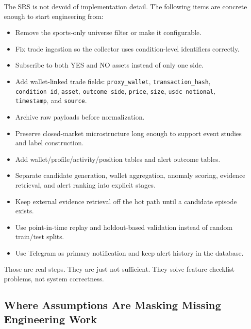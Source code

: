 \documentclass[11pt,letterpaper]{article}
\begin{document}
The SRS is not devoid of implementation detail. The following items are concrete enough to start engineering from:

\begin{itemize}[nosep]
    \item Remove the sports-only universe filter or make it configurable.
    \item Fix trade ingestion so the collector uses condition-level identifiers correctly.
    \item Subscribe to both YES and NO assets instead of only one side.
    \item Add wallet-linked trade fields: \texttt{proxy\_wallet}, \texttt{transaction\_hash}, \texttt{condition\_id}, \texttt{asset}, \texttt{outcome\_side}, \texttt{price}, \texttt{size}, \texttt{usdc\_notional}, \texttt{timestamp}, and \texttt{source}.
    \item Archive raw payloads before normalization.
    \item Preserve closed-market microstructure long enough to support event studies and label construction.
    \item Add wallet/profile/activity/position tables and alert outcome tables.
    \item Separate candidate generation, wallet aggregation, anomaly scoring, evidence retrieval, and alert ranking into explicit stages.
    \item Keep external evidence retrieval off the hot path until a candidate episode exists.
    \item Use point-in-time replay and holdout-based validation instead of random train/test splits.
    \item Use Telegram as primary notification and keep alert history in the database.
\end{itemize}

Those are real steps. They are just not sufficient. They solve feature checklist problems, not system correctness.

\subsection{Where Assumptions Are Masking Missing Engineering Work}
\end{document}
